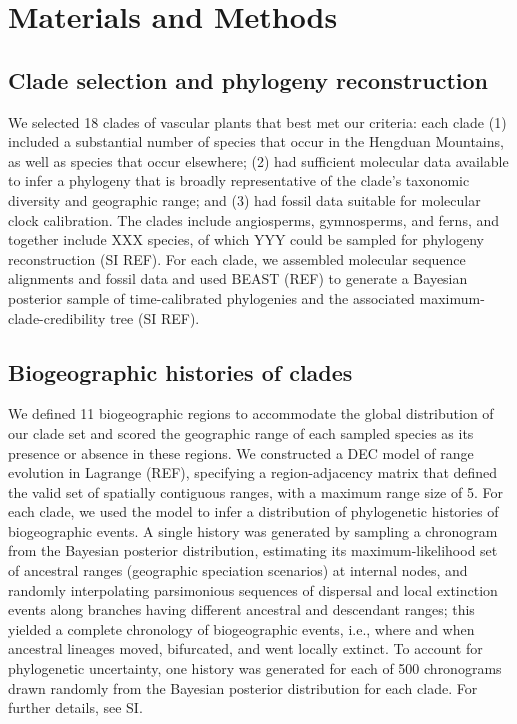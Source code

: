 \section{Materials and Methods}

\subsection{Clade selection and phylogeny reconstruction}

We selected 18 clades of vascular plants that best met our criteria: each clade (1) included a substantial number of species that occur in the Hengduan Mountains, as well as species that occur elsewhere; (2) had sufficient molecular data available to infer a phylogeny that is broadly representative of the clade's taxonomic diversity and geographic range; and (3) had fossil data suitable for molecular clock calibration. The clades include angiosperms, gymnosperms, and ferns, and together include XXX species, of which YYY could be sampled for phylogeny reconstruction (SI REF). For each clade, we assembled molecular sequence alignments and fossil data and used BEAST (REF) to generate a Bayesian posterior sample of time-calibrated phylogenies and the associated maximum-clade-credibility tree (SI REF).

\subsection{Biogeographic histories of clades}

We defined 11 biogeographic regions to accommodate the global distribution of our clade set and scored the geographic range of each sampled species as its presence or absence in these regions. We constructed a DEC model of range evolution in Lagrange (REF), specifying a region-adjacency matrix that defined the valid set of spatially contiguous ranges, with a maximum range size of 5. For each clade, we used the model to infer a distribution of phylogenetic histories of biogeographic events. A single history was generated by sampling a chronogram from the Bayesian posterior distribution, estimating its maximum-likelihood set of ancestral ranges (geographic speciation scenarios) at internal nodes, and randomly interpolating parsimonious sequences of dispersal and local extinction events along branches having different ancestral and descendant ranges; this yielded a complete chronology of biogeographic events, i.e., where and when ancestral lineages moved, bifurcated, and went locally extinct. To account for phylogenetic uncertainty, one history was generated for each of 500 chronograms drawn randomly from the Bayesian posterior distribution for each clade. For further details, see SI.

